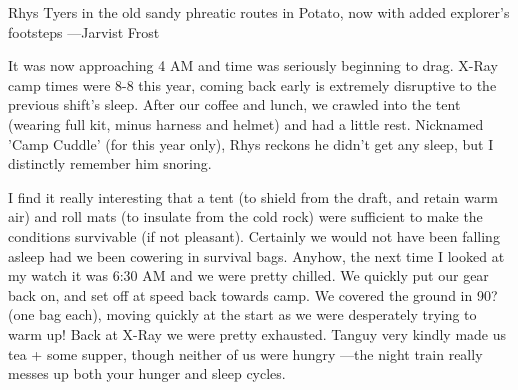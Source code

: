 \begin{marginfigure}
\checkoddpage \ifoddpage \forcerectofloat \else \forceversofloat \fi
\centering
 \caption{Rhys Tyers in the old sandy phreatic routes in Potato, now with added explorer's footsteps ---Jarvist Frost}
 \label{potato formations}
\end{marginfigure}

It was now approaching 4 AM and time was seriously beginning to drag. X-Ray camp times were 8-8 this year, coming back early is extremely disruptive to the previous shift's sleep. After our coffee and lunch, we crawled into the tent (wearing full kit, minus harness and helmet) and had a little rest. Nicknamed 'Camp Cuddle' (for this year only), Rhys reckons he didn't get any sleep, but I distinctly remember him snoring.

I find it really interesting that a tent (to shield from the draft, and retain warm air) and roll mats (to insulate from the cold rock) were sufficient to make the conditions survivable (if not pleasant). Certainly we would not have been falling asleep had we been cowering in survival bags.
Anyhow, the next time I looked at my watch it was 6:30 AM and we were pretty chilled. We quickly put our gear back on, and set off at speed back towards camp. We covered the ground in 90? (one bag each), moving quickly at the start as we were desperately trying to warm up!
Back at X-Ray we were pretty exhausted. Tanguy very kindly made us tea + some supper, though neither of us were hungry ---the night train really messes up both your hunger and sleep cycles.

